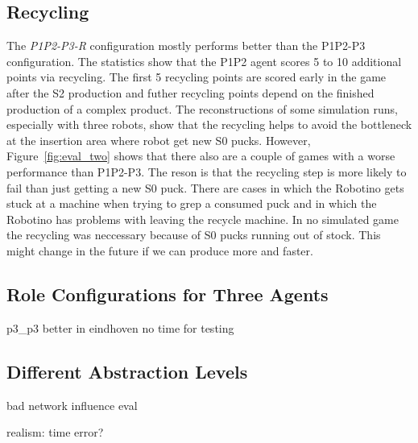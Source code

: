 \subsection{Recycling}
The \textit{P1P2-P3-R} configuration mostly performs better than the P1P2-P3 configuration. The statistics show that the P1P2 agent scores 5 to 10 additional points via recycling. The first 5 recycling points are scored early in the game after the S2 production and futher recycling points depend on the finished production of a complex product. The reconstructions of some simulation runs, especially with three robots, show that the recycling helps to avoid the bottleneck at the insertion area where robot get new S0 pucks. However, Figure~\ref{fig:eval_two} shows that there also are a couple of games with a worse performance than P1P2-P3. The reson is that the recycling step is more likely to fail than just getting a new S0 puck. There are cases in which the Robotino gets stuck at a machine when trying to grep a consumed puck and in which the Robotino has problems with leaving the recycle machine. In no simulated game the recycling was neccessary because of S0 pucks running out of stock. This might change in the future if we can produce more and faster.

\subsection{Role Configurations for Three Agents}
p3\_p3 better in eindhoven no time for testing

\subsection{Different Abstraction Levels}
bad network influence eval




realism: time error?

